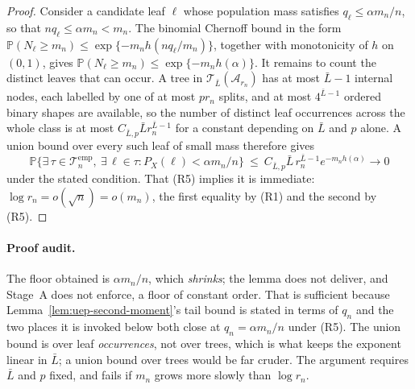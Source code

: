 \documentclass[11pt]{article}
\theoremstyle{plain}
\theoremstyle{definition}
\theoremstyle{remark}
\newcommand{\PP}{\mathbb{P}}
\newcommand{\cA}{\mathcal{A}}
\newcommand{\cT}{\mathcal{T}}
\begin{document}
\begin{proof}
Consider a candidate leaf \(\ell\) whose population mass satisfies
\(q_\ell\le\alpha m_n/n\), so that \(nq_\ell\le\alpha m_n<m_n\). The binomial
Chernoff bound in the form
\(\PP(N_\ell\ge m_n)\le\exp\{-m_nh(nq_\ell/m_n)\}\), together with
monotonicity of \(h\) on \((0,1)\), gives
\(\PP(N_\ell\ge m_n)\le\exp\{-m_nh(\alpha)\}\). It remains to count the
distinct leaves that can occur. A tree in \(\cT_{\bar L}(\cA_{r_n})\) has at
most \(\bar L-1\) internal nodes, each labelled by one of at most \(pr_n\)
splits, and at most \(4^{\bar L-1}\) ordered binary shapes are available, so
the number of distinct leaf occurrences across the whole class is at most
\(C_{\bar L,p}\bar Lr_n^{\bar L-1}\) for a constant depending on \(\bar L\)
and \(p\) alone. A union bound over every such leaf of small mass therefore
gives
\[
  \PP\bigl\{
    \exists\,\tau\in\cT^{\mathrm{emp}}_n,\ \exists\,\ell\in\tau:
    P_X(\ell)<\alpha m_n/n
  \bigr\}
  \ \le\
  C_{\bar L,p}\bar L\,r_n^{\bar L-1}e^{-m_nh(\alpha)}
  \longrightarrow0
\]
under the stated condition. That (R5) implies it is immediate:
\(\log r_n=o(\sqrt n)=o(m_n)\), the first equality by (R1) and the second
by (R5).
\end{proof}

\paragraph{Proof audit.}
The floor obtained is \(\alpha m_n/n\), which \emph{shrinks}; the lemma does
not deliver, and Stage~A does not enforce, a floor of constant order. That is
sufficient because Lemma~\ref{lem:uep-second-moment}'s tail bound is stated in
terms of \(q_n\) and the two places it is invoked below both close at
\(q_n=\alpha m_n/n\) under (R5). The union bound is over leaf
\emph{occurrences}, not over trees, which is what keeps the exponent linear in
\(\bar L\); a union bound over trees would be far cruder. The argument
requires \(\bar L\) and \(p\) fixed, and fails if \(m_n\) grows more slowly
than \(\log r_n\).
\end{document}
